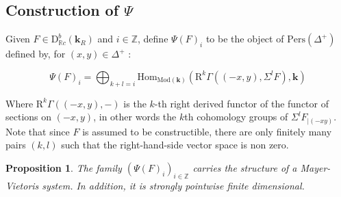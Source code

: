 \documentclass[a4paper, english, 11pt]{article}
\newcommand{\kk}[0]{\textbf{k}}
\newcommand{\Mod}[0]{\text{Mod}}
\newcommand{\0}{\vec{0}}
\newcommand{\R}[0]{\mathbb{R}}
\newcommand{\Z}[0]{\mathbb{Z}}
\newcommand{\D}[0]{\text{D}}
\newcommand{\Hom}[0]{\text{Hom}}
\newcommand{\Pers}[0]{\text{Pers}}
\newcommand{\Rr}[0]{\text{R}}
\newtheorem{prop}{Proposition}[section]
\begin{document}
\subsection{Construction of $\Psi$}

Given $F \in \D^b_{\R c}(\kk_R)$ and $i \in \Z$, define $\Psi(F)_i$ to be the object of $\Pers(\Delta^+)$ defined by, for $(x,y)\in \Delta^+$ : 

$$\Psi(F)_i =\bigoplus_{k+l = i} \Hom_{\Mod(\kk)}\left ( \Rr^k\Gamma \left ( (-x,y) , \Sigma^l F\right ), \kk \right )  $$

Where $\Rr^k\Gamma \left ( (-x,y) , -\right )$ is the $k$-th right derived functor of the functor of sections on $(-x,y)$, in other words the $k$th cohomology groups of $\Sigma^l F_{|(-xy)}$. Note that since $F$ is assumed to be constructible, there are only finitely many pairs $(k,l)$ such that the right-hand-side vector space is non zero.

\begin{prop}\label{P:psiofCOnstrisMV}
The family $(\Psi(F)_i)_{i\in \Z}$ carries the structure of a Mayer-Vietoris system. In addition, it is strongly pointwise finite dimensional. 
\end{prop}
\end{document}
